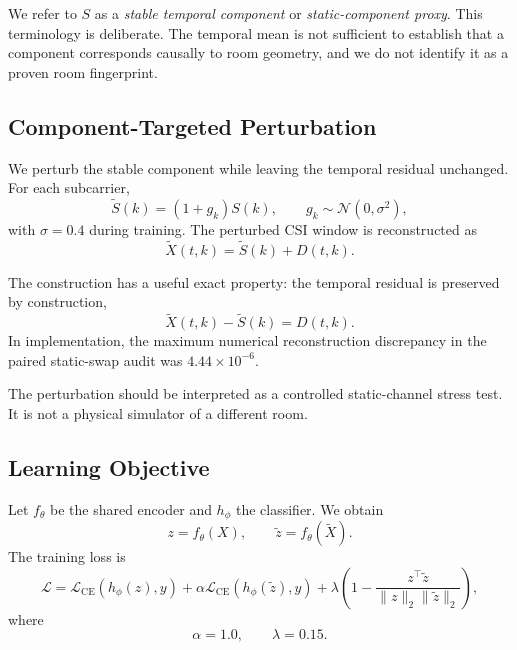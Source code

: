 \documentclass[runningheads]{llncs}
\begin{document}
We refer to $S$ as a \emph{stable temporal component} or \emph{static-component proxy}. This terminology is deliberate. The temporal mean is not sufficient to establish that a component corresponds causally to room geometry, and we do not identify it as a proven room fingerprint.

\subsection{Component-Targeted Perturbation}

We perturb the stable component while leaving the temporal residual unchanged. For each subcarrier,
\begin{equation}
    \widetilde{S}(k)=(1+g_k)S(k),
    \qquad
    g_k\sim\mathcal{N}(0,\sigma^2),
\end{equation}
with $\sigma=0.4$ during training. The perturbed CSI window is reconstructed as
\begin{equation}
    \widetilde{X}(t,k)=\widetilde{S}(k)+D(t,k).
\end{equation}

The construction has a useful exact property: the temporal residual is preserved by construction,
\begin{equation}
    \widetilde{X}(t,k)-\widetilde{S}(k)=D(t,k).
\end{equation}
In implementation, the maximum numerical reconstruction discrepancy in the paired static-swap audit was $4.44\times10^{-6}$.

The perturbation should be interpreted as a controlled static-channel stress test. It is not a physical simulator of a different room.

\subsection{Learning Objective}

Let $f_\theta$ be the shared encoder and $h_\phi$ the classifier. We obtain
\begin{equation}
    z=f_\theta(X), \qquad
    \widetilde{z}=f_\theta(\widetilde{X}).
\end{equation}
The training loss is
\begin{equation}
\mathcal{L}
=
\mathcal{L}_{\mathrm{CE}}(h_\phi(z),y)
+
\alpha\mathcal{L}_{\mathrm{CE}}(h_\phi(\widetilde{z}),y)
+
\lambda
\left(
1-\frac{z^\top\widetilde{z}}
{\|z\|_2\|\widetilde{z}\|_2}
\right),
\label{eq:objective}
\end{equation}
where
\begin{equation}
    \alpha=1.0,\qquad \lambda=0.15.
\end{equation}
\end{document}
